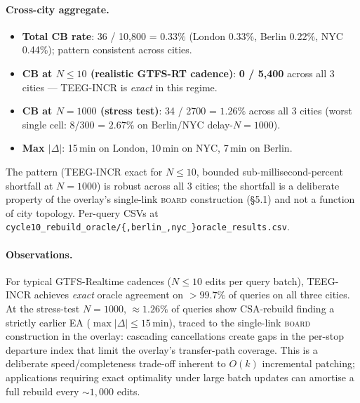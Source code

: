 \documentclass[letterpaper]{article}
\begin{document}
\paragraph{Cross-city aggregate.}
\begin{itemize}
\item \textbf{Total CB rate}: 36 / 10{,}800 = $0.33\%$
(London 0.33\%, Berlin 0.22\%, NYC 0.44\%); pattern consistent across cities.
\item \textbf{CB at $N \leq 10$ (realistic GTFS-RT cadence)}:
\textbf{0 / 5{,}400} across all 3 cities --- TEEG-INCR is \emph{exact}
in this regime.
\item \textbf{CB at $N\!=\!1000$ (stress test)}: 34 / 2700 = $1.26\%$
across all 3 cities (worst single cell: 8/300 = $2.67\%$ on
Berlin/NYC delay-$N\!=\!1000$).
\item \textbf{Max $|\Delta|$}: 15\,min on London, 10\,min on NYC,
7\,min on Berlin.
\end{itemize}
The pattern (TEEG-INCR exact for $N\!\leq\!10$, bounded
sub-millisecond-percent shortfall at $N\!=\!1000$) is robust across
all 3 cities; the shortfall is a deliberate property of the overlay's
single-link \textsc{board} construction (\S5.1) and not a function of
city topology. Per-query CSVs at
\texttt{cycle10\_rebuild\_oracle/\{,berlin\_,nyc\_\}oracle\_results.csv}.

\paragraph{Observations.}
For typical GTFS-Realtime cadences ($N \leq 10$ edits per query batch),
TEEG-INCR achieves \emph{exact} oracle agreement on $> 99.7\%$ of
queries on all three cities. At the stress-test $N\!=\!1000$, $\approx 1.26\%$
of queries show CSA-rebuild finding a strictly earlier EA
($\max|\Delta| \leq 15$\,min), traced to the single-link \textsc{board}
construction in the overlay: cascading cancellations create gaps in the
per-stop departure index that limit the overlay's transfer-path
coverage. This is a deliberate speed/completeness trade-off inherent
to $O(k)$ incremental patching; applications requiring exact
optimality under large batch updates can amortise a full rebuild
every $\sim\!1{,}000$ edits.
\end{document}

